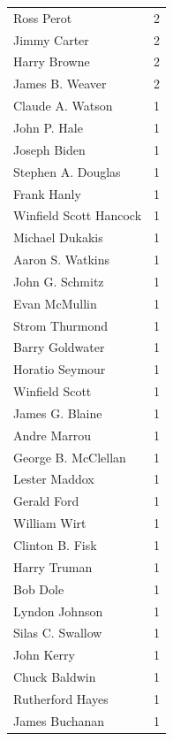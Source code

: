 \documentclass[
  letterpaper,
  DIV=11,
  numbers=noendperiod]{scrreprt}
\begin{document}
\begin{tabular}{lr}
Ross Perot             &          2 \\
Jimmy Carter           &          2 \\
Harry Browne           &          2 \\
James B. Weaver        &          2 \\
Claude A. Watson       &          1 \\
John P. Hale           &          1 \\
Joseph Biden           &          1 \\
Stephen A. Douglas     &          1 \\
Frank Hanly            &          1 \\
Winfield Scott Hancock &          1 \\
Michael Dukakis        &          1 \\
Aaron S. Watkins       &          1 \\
John G. Schmitz        &          1 \\
Evan McMullin          &          1 \\
Strom Thurmond         &          1 \\
Barry Goldwater        &          1 \\
Horatio Seymour        &          1 \\
Winfield Scott         &          1 \\
James G. Blaine        &          1 \\
Andre Marrou           &          1 \\
George B. McClellan    &          1 \\
Lester Maddox          &          1 \\
Gerald Ford            &          1 \\
William Wirt           &          1 \\
Clinton B. Fisk        &          1 \\
Harry Truman           &          1 \\
Bob Dole               &          1 \\
Lyndon Johnson         &          1 \\
Silas C. Swallow       &          1 \\
John Kerry             &          1 \\
Chuck Baldwin          &          1 \\
Rutherford Hayes       &          1 \\
James Buchanan         &          1 \\

\end{tabular}
\end{document}
